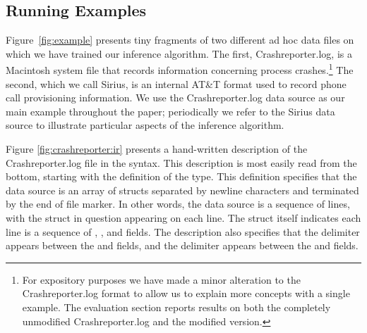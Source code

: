 \subsection{Running Examples}

Figure~\ref{fig:example} presents tiny fragments of two
different ad hoc data files on which we have trained our inference algorithm.
The first, Crashreporter.log, is a Macintosh
system file that records information concerning process crashes.\footnote{For
expository purposes we have made a minor alteration to the Crashreporter.log
format to allow us to explain more concepts with a single example.
The evaluation section reports results on both the  
completely unmodified Crashreporter.log and the modified version.} 
The second, which we call Sirius, is an internal AT\&T format used to
record phone call provisioning information. 
We use the Crashreporter.log data source as our main example throughout the
paper; periodically we refer to the Sirius data source to illustrate 
particular aspects of the inference algorithm.  



Figure \ref{fig:crashreporter:ir} presents a hand-written description
of the Crashreporter.log file in the \ir{} syntax.  This
description is most easily read from the bottom, starting
with the definition of the  type.  This definition specifies that
the data source is an
array of structs separated by newline characters and
terminated by the end of file marker.  In other words,
the data source is a sequence of lines, with the struct
in question appearing on each line.  
The struct itself indicates each line is a sequence of
, ,  and  fields.  
The description also specifies that the delimiter \cd{"["} 
appears between the  and  fields, and the
delimiter \cd{"]: "} appears between the  and 
 fields.


